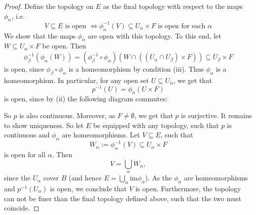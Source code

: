     \begin{proof}
        Define the topology on $E$ as the final topology with respect to the maps $\phi_\alpha$, i.e.
        \[
        V \subseteq E \text{ is open } \Leftrightarrow \phi_\alpha^{-1}(V) \subseteq U_\alpha \times F \text{ is open for each } \alpha
        \]
        We show that the maps $\phi_\alpha$ are open with this topology. To this end, let $W \subseteq U_\alpha \times F$ be open. Then
        \[
        \phi_\beta^{-1}(\phi_\alpha(W)) = (\phi_\beta^{-1} \circ \phi_\alpha)(W \cap ((U_\alpha \cap U_\beta) \times F)) \subseteq U_\beta \times F
        \]
        is open, since $\phi_\beta \circ \phi_\alpha$ is a homeomorphism by condition (iii). Thus $\phi_\alpha$ is a homeomorphism. In particular, for any open set $U \subseteq U_\alpha$, we get that
        \[
        p^{-1}(U) = \phi_\alpha(U \times F)
        \]
        is open, since by (ii) the following diagram commutes:
        \begin{center}
        \end{center}
        So $p$ is also continuous. Moreover, as $F \neq \emptyset$, we get that $p$ is surjective. It remains to show uniqueness. So let $E$ be equipped with any topology, such that $p$ is continuous and $\phi_\alpha$ are homeomorphisms. Let $V \subseteq E$, such that 
        \[
        W_\alpha := \phi_\alpha^{-1}(V) \subseteq U_\alpha \times F
        \]
        is open for all $\alpha$. Then 
        \[
        V = \bigcup_\alpha W_\alpha,
        \]
        since the $U_\alpha$ cover $B$ (and hence $E = \bigcup_\alpha \mathrm{im}\phi_\alpha$). As the $\phi_\alpha$ are homeomorphisms and $p^{-1}(U_\alpha)$ is open, we conclude that $V$ is open. Furthermore, the topology can not be finer than the final topology defined above, such that the two must coincide.
     \end{proof}

